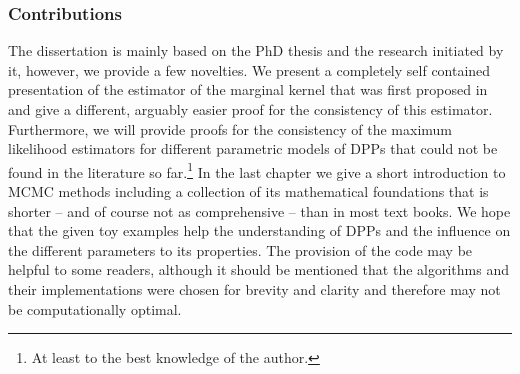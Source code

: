 \subsubsection{Contributions}
The dissertation is mainly based on the PhD thesis \cite{kulesza2012learning} and the research initiated by it, however, we provide a few novelties. We present a completely self contained presentation of the estimator of the marginal kernel that was first proposed in \cite{urschel2017learning} and give a different, arguably easier proof for the consistency of this estimator. Furthermore, we will provide proofs for the consistency of the maximum likelihood estimators for different parametric models of DPPs that could not be found in the literature so far.\footnote{At least to the best knowledge of the author.} In the last chapter we give a short introduction to MCMC methods including a collection of its mathematical foundations that is shorter -- and of course not as comprehensive -- than in most text books. We hope that the given toy examples help the understanding of DPPs and the influence on the different parameters to its properties. The provision of the code may be helpful to some readers, although it should be mentioned that the algorithms and their implementations were chosen for brevity and clarity and therefore may not be computationally optimal.
